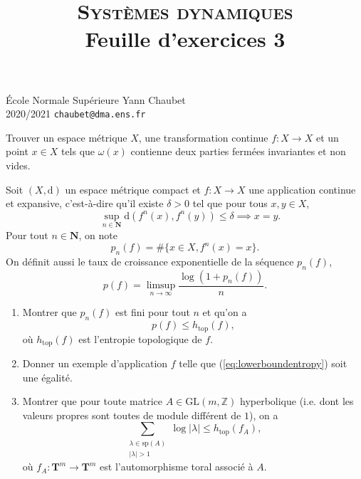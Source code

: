 \documentclass[a4paper,10pt,openany]{article}
\title{\textsc{Syst\`emes dynamiques} \\ Feuille d'exercices 3}
\date{}
\author{}
\theoremstyle{plain}
\theoremstyle{definition}
\newcommand{\dd}{\mathrm{d}}
\newcommand{\T}{\mathbf{T}}
\newcommand{\N}{\mathbf{N}}
\begin{document}
{\noindent \'Ecole Normale Sup\'erieure  \hfill Yann Chaubet } \\
{2020/2021 \hfill \texttt{chaubet@dma.ens.fr}}

{\let\newpage\relax\maketitle}
\maketitle

 \vspace{1.5mm} 

\noindent Trouver un espace m\'etrique $X$, une transformation continue $f : X \to X$ et un point $x \in X$ tels que $\omega(x)$ contienne deux parties ferm\'ees invariantes et non vides.

\vspace{0.6cm}

 \vspace{1.5mm} 

\noindent Soit $(X, \dd)$ un espace m\'etrique compact et $f : X \to X$ une application continue et expansive, c'est-\`a-dire qu'il existe $\delta > 0$ tel que pour tous $x, y \in X$,
$$
\quad \sup_{n\in \N} \dd(f^n(x),f^n(y)) \leq \delta \implies x = y.
$$
Pour tout $n \in \N$, on note
$$
p_n(f) = \#\{x \in X, f^n(x) = x\}.
$$
On d\'efinit aussi le taux de croissance exponentielle de la s\'equence $p_n(f)$,
$$
p(f) = \limsup_{n \to \infty} \frac{\log(1 + p_n(f))}{n}.
$$
\begin{enumerate}
\item Montrer que $p_n(f)$ est fini pour tout $n$ et qu'on a
\begin{equation}\label{eq:lowerboundentropy}
p(f) \leq h_{\mathrm{top}}(f),
\end{equation}
o\`u $h_\mathrm{top}(f)$ est l'entropie topologique de $f$.
\item Donner un exemple d'application $f$ telle que (\ref{eq:lowerboundentropy}) soit une \'egalit\'e.
\item Montrer que pour toute matrice $A \in \mathrm{GL}(m,\mathbb{Z})$ hyperbolique (i.e. dont les valeurs propres sont toutes de module diff\'erent de $1$), on a
$$
\sum_{\substack{\lambda \in \mathrm{sp}(A) \\ |\lambda| > 1 }} \log |\lambda| \leq h_\mathrm{top}(f_A),
$$
o\`u $f_A : \T^m \to \T^m$ est l'automorphisme toral associ\'e \`a $A$.
\end{enumerate}
\end{document}
